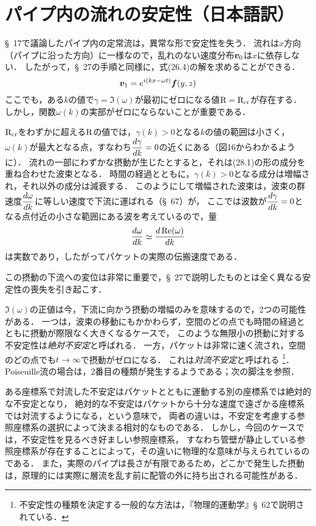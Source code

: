 \section{\spade パイプ内の流れの安定性（日本語訳）} 
\S~17で議論したパイプ内の定常流は，異常な形で安定性を失う．
流れは$x$方向（パイプに沿った方向）に一様なので，乱れのない速度分布$\vb*{v}_0$は$x$に依存しない．
したがって，\S~27の手順と同様に，式(26.4)の解を求めることができる．
\begin{equation}
    \vb*{v}_1 = e^{i(kx-\omega t)} \vb*{f}(y,z)
\end{equation}
ここでも，ある$k$の値で$\gamma=\Im(\omega)$が最初にゼロになる値$\mathrm{R}=\mathrm{R}_{\mathrm{cr}}$が存在する．
しかし，関数$\omega(k)$の実部がゼロにならないことが重要である．


$\mathrm{R}_{\mathrm{cr}}$をわずかに超える$\mathrm{R}$の値では，$\gamma(k)>0$となる$k$の値の範囲は小さく，
$\omega(k)$が最大となる点，すなわち$\ddv{\gamma}{k}=0$の近くにある（図16からわかるように）．
流れの一部にわずかな摂動が生じたとすると，それは(28.1)の形の成分を重ね合わせた波束となる．
時間の経過とともに，$\gamma(k)>0$となる成分は増幅され，それ以外の成分は減衰する．
このようにして増幅された波束は，波束の群速度$\ddv{\omega}{k}$に等しい速度で下流に運ばれる（\S~67）が，
ここでは波数が$\ddv{\gamma}{k}=0$となる点付近の小さな範囲にある波を考えているので，量
\begin{equation}
    \dv{\omega}{k} \simeq \dv{\Re(\omega)}{k}
\end{equation}
は実数であり，したがってパケットの実際の伝搬速度である．


この摂動の下流への変位は非常に重要で，\S~27で説明したものとは全く異なる安定性の喪失を引き起こす．



$\Im(\omega)$の正値は今，下流に向かう摂動の増幅のみを意味するので，2つの可能性がある．
一つは，波束の移動にもかかわらず，空間のどの点でも時間の経過とともに摂動が際限なく大きくなるケースで，
このような無限小の摂動に対する不安定性は\emph{絶対不安定}と呼ばれる．
一方，パケットは非常に速く流され，空間のどの点でも$t\to\infty$で摂動がゼロになる．
これは\emph{対流不安定}と呼ばれる
\footnote{不安定性の種類を決定する一般的な方法は，『物理的運動学』\S~62で説明されている．}．
Poiseuille流の場合は，2番目の種類が発生するようである；次の脚注を参照．



ある座標系で対流した不安定はパケットとともに運動する別の座標系では絶対的な不安定となり，
絶対的な不安定はパケットから十分な速度で遠ざかる座標系では対流するようになる，という意味で，
両者の違いは，不安定を考慮する参照座標系の選択によって決まる相対的なものである．
しかし，今回のケースでは，不安定性を見るべき好ましい参照座標系，
すなわち管壁が静止している参照座標系が存在することによって，その違いに物理的な意味が与えられているのである．
また，実際のパイプは長さが有限であるため，どこかで発生した摂動は，原理的には実際に層流を乱す前に配管の外に持ち出される可能性がある．



